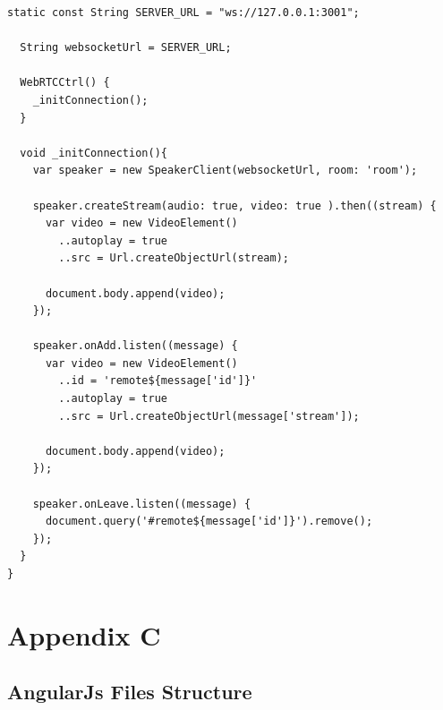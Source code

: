 \begin{appendices}
\begin{lstlisting}[caption={WebRTCCtrl in Dart application client},label={code:dart_webrtcctrl}]
  static const String SERVER_URL = "ws://127.0.0.1:3001";

  String websocketUrl = SERVER_URL;

  WebRTCCtrl() {
    _initConnection();
  }

  void _initConnection(){
    var speaker = new SpeakerClient(websocketUrl, room: 'room');

    speaker.createStream(audio: true, video: true ).then((stream) {
      var video = new VideoElement()
        ..autoplay = true
        ..src = Url.createObjectUrl(stream);

      document.body.append(video);
    });

    speaker.onAdd.listen((message) {
      var video = new VideoElement()
        ..id = 'remote${message['id']}'
        ..autoplay = true
        ..src = Url.createObjectUrl(message['stream']);

      document.body.append(video);
    });

    speaker.onLeave.listen((message) {
      document.query('#remote${message['id']}').remove();
    });
  }
}
\end{lstlisting}

\chapter{Appendix C}

\section{AngularJs Files Structure} \label{code:angularjs_structure}


\end{appendices}
